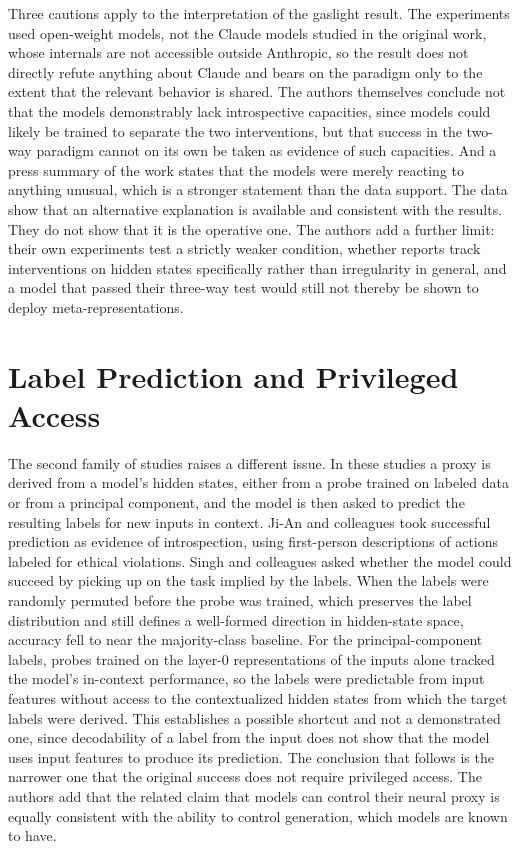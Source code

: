 \documentclass[11pt]{article}
\theoremstyle{definition}
\theoremstyle{remark}
\begin{document}
Three cautions apply to the interpretation of the gaslight result. The experiments used open-weight models, not the Claude models studied in the original work, whose internals are not accessible outside Anthropic, so the result does not directly refute anything about Claude and bears on the paradigm only to the extent that the relevant behavior is shared. The authors themselves conclude not that the models demonstrably lack introspective capacities, since models could likely be trained to separate the two interventions, but that success in the two-way paradigm cannot on its own be taken as evidence of such capacities. And a press summary of the work states that the models were merely reacting to anything unusual, which is a stronger statement than the data support. The data show that an alternative explanation is available and consistent with the results. They do not show that it is the operative one. The authors add a further limit: their own experiments test a strictly weaker condition, whether reports track interventions on hidden states specifically rather than irregularity in general, and a model that passed their three-way test would still not thereby be shown to deploy meta-representations.

\section{Label Prediction and Privileged Access}

The second family of studies raises a different issue. In these studies a proxy is derived from a model's hidden states, either from a probe trained on labeled data or from a principal component, and the model is then asked to predict the resulting labels for new inputs in context. Ji-An and colleagues \citeyearpar{jian2025} took successful prediction as evidence of introspection, using first-person descriptions of actions labeled for ethical violations. Singh and colleagues asked whether the model could succeed by picking up on the task implied by the labels. When the labels were randomly permuted before the probe was trained, which preserves the label distribution and still defines a well-formed direction in hidden-state space, accuracy fell to near the majority-class baseline. For the principal-component labels, probes trained on the layer-0 representations of the inputs alone tracked the model's in-context performance, so the labels were predictable from input features without access to the contextualized hidden states from which the target labels were derived. This establishes a possible shortcut and not a demonstrated one, since decodability of a label from the input does not show that the model uses input features to produce its prediction. The conclusion that follows is the narrower one that the original success does not require privileged access. The authors add that the related claim that models can control their neural proxy is equally consistent with the ability to control generation, which models are known to have.
\end{document}
